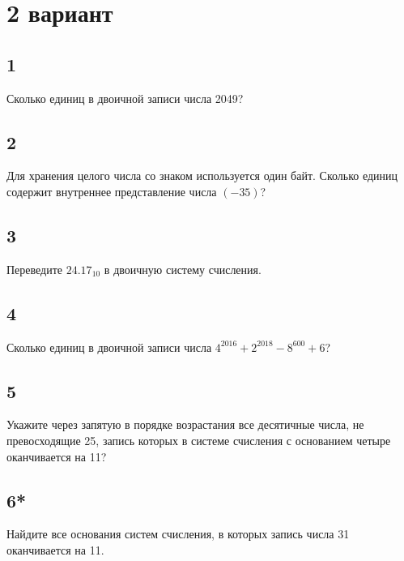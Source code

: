 \documentclass[a4paper,12pt]{article}
\begin{document}
\section*{2 вариант} 

\subsection*{1}
Сколько единиц в двоичной записи числа 2049? 

\subsection*{2}
Для хранения целого числа со знаком используется один байт. Сколько единиц содержит внутреннее представление числа $(-35)$?

\subsection*{3}
Переведите $24.17_{10}$ в двоичную систему счисления.

\subsection*{4}
Сколько единиц в двоичной записи числа $4^{2016}  + 2^{2018} - 8^{600} + 6$?

\subsection*{5}
Укажите через запятую в порядке возрастания все десятичные числа, не превосходящие 25, запись которых в системе счисления с основанием четыре оканчивается на 11?  

\subsection*{6*}
Найдите все основания систем счисления, в которых запись числа 31 оканчивается на 11.
\end{document}
